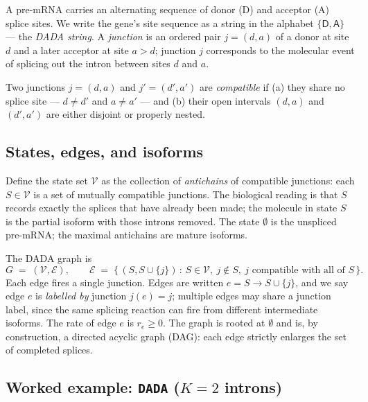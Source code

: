 \documentclass[11pt, a4paper]{article}
\begin{document}
A pre-mRNA carries an alternating sequence of donor (\textsf{D}) and acceptor (\textsf{A}) splice sites. We write the gene's site sequence as a string in the alphabet $\{\textsf{D}, \textsf{A}\}$ --- the \emph{DADA string}. A \emph{junction} is an ordered pair $j = (d, a)$ of a donor at site $d$ and a later acceptor at site $a > d$; junction $j$ corresponds to the molecular event of splicing out the intron between sites $d$ and $a$.

Two junctions $j = (d, a)$ and $j' = (d', a')$ are \emph{compatible} if (a) they share no splice site --- $d \neq d'$ and $a \neq a'$ --- and (b) their open intervals $(d, a)$ and $(d', a')$ are either disjoint or properly nested.

\subsection{States, edges, and isoforms}

Define the state set $\mathcal{V}$ as the collection of \emph{antichains} of compatible junctions: each $S \in \mathcal{V}$ is a set of mutually compatible junctions. The biological reading is that $S$ records exactly the splices that have already been made; the molecule in state $S$ is the partial isoform with those introns removed. The state $\emptyset$ is the unspliced pre-mRNA; the maximal antichains are mature isoforms.

The DADA graph is
\[
G \;=\; (\mathcal{V}, \mathcal{E}), \qquad \mathcal{E} \;=\; \big\{\, (S, S \cup \{j\}) \,:\, S \in \mathcal{V},\ j \notin S,\ j \text{ compatible with all of } S \,\big\}.
\]
Each edge fires a single junction. Edges are written $e = S \to S \cup \{j\}$, and we say edge $e$ is \emph{labelled by} junction $j(e) = j$; multiple edges may share a junction label, since the same splicing reaction can fire from different intermediate isoforms. The rate of edge $e$ is $r_e \geq 0$. The graph is rooted at $\emptyset$ and is, by construction, a directed acyclic graph (DAG): each edge strictly enlarges the set of completed splices.

\subsection{Worked example: \texttt{DADA} (\texorpdfstring{$K = 2$ introns}{K=2 introns})}
\label{sec:dada-example}
\end{document}

